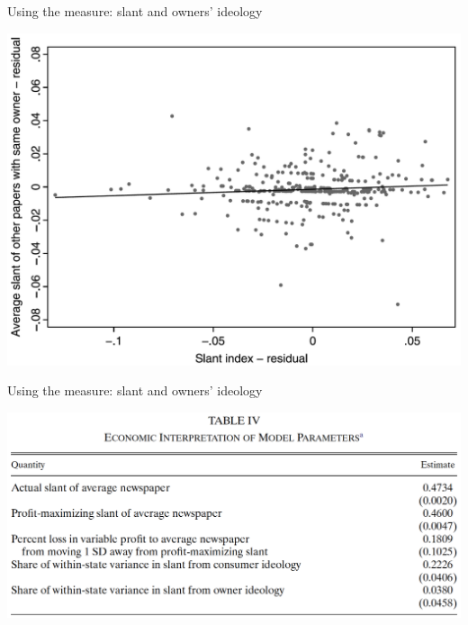 \documentclass[english]{beamer}
\begin{document}
\begin{frame}{Using the measure: slant and owners' ideology}
\vspace{-7pt}
\begin{center}
\includegraphics[scale=0.42]{Images/gentzkow_figure1}
\end{center}
\end{frame}

\begin{frame}{Using the measure: slant and owners' ideology}
\vspace{-7pt}
\begin{center}
\includegraphics[scale=0.38]{Images/gentzkow_table5}
\end{center}
\end{frame}
\end{document}
